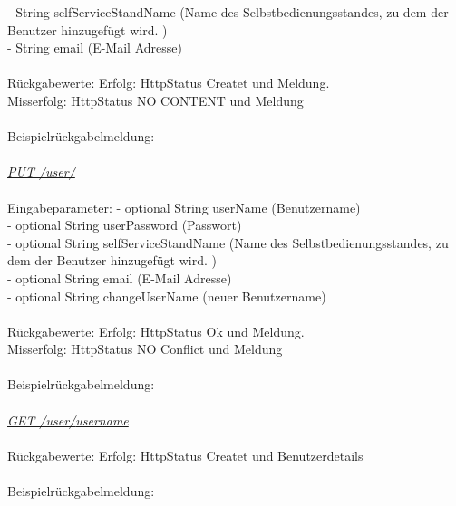 \tab \tab                         		- String selfServiceStandName (Name des Selbstbedienungsstandes, zu dem der Benutzer hinzugefügt wird. ) \\
\tab \tab                         		- String email (E-Mail Adresse) \\                  
\\
Rückgabewerte: \tab 					Erfolg: HttpStatus Createt und Meldung.\\
\tab \tab 								Misserfolg: HttpStatus NO CONTENT und Meldung\\
\\
Beispielrückgabelmeldung:	
\\
\\
\textit{\underline{PUT /user/}}
\\
\\
Eingabeparameter: \tab			- optional String userName (Benutzername)\\
\tab \tab                        		- optional String userPassword (Passwort)\\
\tab \tab                         		- optional String selfServiceStandName (Name des Selbstbedienungsstandes, zu dem der Benutzer hinzugefügt wird. ) \\
\tab \tab                         		- optional String email (E-Mail Adresse)\\
\tab \tab                         		- optional String changeUserName (neuer Benutzername)\\                   
\\
Rückgabewerte: \tab 					Erfolg: HttpStatus Ok und Meldung.\\
\tab \tab 								Misserfolg: HttpStatus NO Conflict und Meldung\\
\\
Beispielrückgabelmeldung:	
\\
\\
\textit{\underline{GET /user/{username}}}
\\                  
\\
Rückgabewerte: \tab 					Erfolg: HttpStatus Createt und Benutzerdetails\\
\\
Beispielrückgabelmeldung:	
\\
\\
